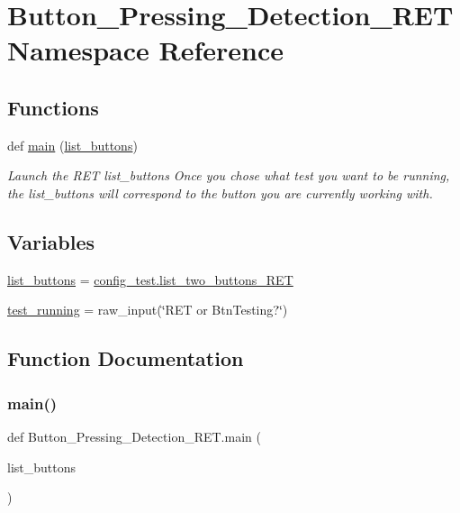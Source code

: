 \hypertarget{a00023}{}\section{Button\+\_\+\+Pressing\+\_\+\+Detection\+\_\+\+R\+ET Namespace Reference}
\label{a00023}
\subsection*{Functions}
\begin{DoxyCompactItemize}
\item 
def \hyperlink{a00023_aa89deed443742aced73418959c6b3465}{main} (\hyperlink{a00023_a50ea04db981a8afa82086a60a58ae466}{list\+\_\+buttons})
\begin{DoxyCompactList}\small\item\em Launch the R\+ET  list\+\_\+buttons Once you chose what test you want to be running, the list\+\_\+buttons will correspond to the button you are currently working with. \end{DoxyCompactList}\end{DoxyCompactItemize}
\subsection*{Variables}
\begin{DoxyCompactItemize}
\item 
\hyperlink{a00023_a50ea04db981a8afa82086a60a58ae466}{list\+\_\+buttons} = \hyperlink{a00025_aceb7d96541943b4a77c54516a2be88d2}{config\+\_\+test.\+list\+\_\+two\+\_\+buttons\+\_\+\+R\+ET}
\item 
\hyperlink{a00023_ad6dd5511fc0d9b712fc3f74e188a7cb8}{test\+\_\+running} = raw\+\_\+input(\char`\"{}R\+ET or Btn\+Testing?\char`\"{})
\end{DoxyCompactItemize}


\subsection{Function Documentation}
\mbox{\label{a00023_aa89deed443742aced73418959c6b3465}} 
\subsubsection{\texorpdfstring{main()}{main()}}
{\footnotesize\ttfamily def Button\+\_\+\+Pressing\+\_\+\+Detection\+\_\+\+R\+E\+T.\+main (\begin{DoxyParamCaption}\item[{}]{list\+\_\+buttons }\end{DoxyParamCaption})}



